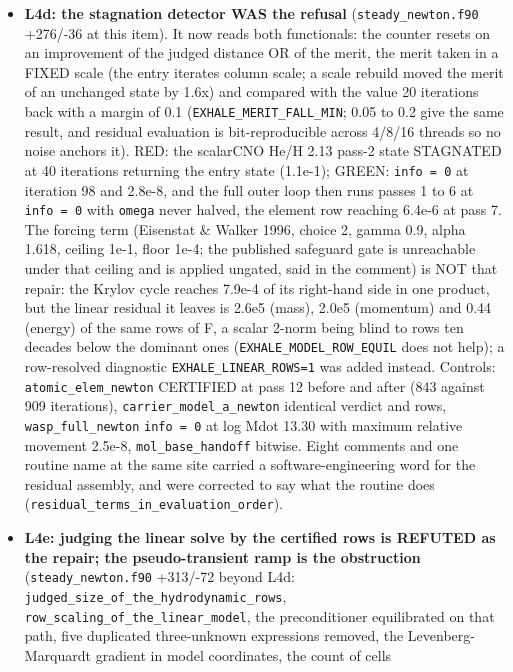 \documentclass[english,a4paper]{my_memo}
\begin{document}
\begin{itemize}
  term (item L4d).
\item
  \textbf{L4d: the stagnation detector WAS the refusal} (\texttt{steady\_newton.f90}
  +276/-36 at this item). It now reads both functionals: the counter resets
  on an improvement of the judged distance OR of the merit, the merit taken
  in a FIXED scale (the entry iterate\textquotesingle s column scale; a scale rebuild moved
  the merit of an unchanged state by 1.6x) and compared with the value 20
  iterations back with a margin of 0.1 (\texttt{EXHALE\_MERIT\_FALL\_MIN}; 0.05 to 0.2
  give the same result, and residual evaluation is bit-reproducible across
  4/8/16 threads so no noise anchors it). RED: the scalarCNO He/H 2.13
  pass-2 state STAGNATED at 40 iterations returning the entry state (1.1e-1);
  GREEN: \texttt{info\ =\ 0} at iteration 98 and 2.8e-8, and the full outer loop then
  runs passes 1 to 6 at \texttt{info\ =\ 0} with \texttt{omega} never halved, the element row
  reaching 6.4e-6 at pass 7. The forcing term (Eisenstat \& Walker 1996,
  choice 2, gamma 0.9, alpha 1.618, ceiling 1e-1, floor 1e-4; the published
  safeguard gate is unreachable under that ceiling and is applied ungated,
  said in the comment) is NOT that repair: the Krylov cycle reaches 7.9e-4 of
  its right-hand side in one product, but the linear residual it leaves is
  2.6e5 (mass), 2.0e5 (momentum) and 0.44 (energy) of the same rows of F, a
  scalar 2-norm being blind to rows ten decades below the dominant ones
  (\texttt{EXHALE\_MODEL\_ROW\_EQUIL} does not help); a row-resolved diagnostic
  \texttt{EXHALE\_LINEAR\_ROWS=1} was added instead. Controls: \texttt{atomic\_elem\_newton}
  CERTIFIED at pass 12 before and after (843 against 909 iterations),
  \texttt{carrier\_model\_a\_newton} identical verdict and rows, \texttt{wasp\_full\_newton}
  \texttt{info\ =\ 0} at log Mdot 13.30 with maximum relative movement 2.5e-8,
  \texttt{mol\_base\_handoff} bitwise. Eight comments and one routine name at the
  same site carried a software-engineering word for the residual assembly,
  and were corrected to say what the routine does
  (\texttt{residual\_terms\_in\_evaluation\_order}).
\item
  \textbf{L4e: judging the linear solve by the certified rows is REFUTED as the
  repair; the pseudo-transient ramp is the obstruction} (\texttt{steady\_newton.f90}
  +313/-72 beyond L4d: \texttt{judged\_size\_of\_the\_hydrodynamic\_rows},
  \texttt{row\_scaling\_of\_the\_linear\_model}, the preconditioner equilibrated on that
  path, five duplicated three-unknown expressions removed, the
  Levenberg-Marquardt gradient in model coordinates, the count of cells

\end{itemize}
\end{document}
